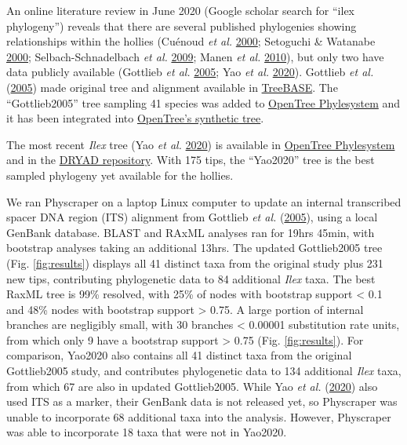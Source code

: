 \documentclass[]{article}
\begin{document}
An online literature review in June 2020 (Google scholar search for ``ilex phylogeny'') reveals that there are several published phylogenies showing relationships within the hollies (Cuénoud \emph{et al.} \protect\hyperlink{ref-cuenoud2000molecular}{2000}; Setoguchi \& Watanabe \protect\hyperlink{ref-setoguchi2000intersectional}{2000}; Selbach-Schnadelbach \emph{et al.} \protect\hyperlink{ref-selbach2009new}{2009}; Manen \emph{et al.} \protect\hyperlink{ref-manen2010history}{2010}), but only two have data publicly available (Gottlieb \emph{et al.} \protect\hyperlink{ref-gottlieb2005molecular}{2005}; Yao \emph{et al.} \protect\hyperlink{ref-yao2020phylogeny}{2020}).
Gottlieb \emph{et al.} (\protect\hyperlink{ref-gottlieb2005molecular}{2005}) made original tree and alignment available in \href{https://treebase.org/treebase-web/search/study/summary.html?id=1091}{TreeBASE}. The ``Gottlieb2005'' tree sampling 41 species was added to \href{https://tree.opentreeoflife.org/curator/study/edit/pg_2827/?tab=home}{OpenTree Phylesystem} and it has been integrated into \href{https://devtree.opentreeoflife.org/opentree/opentree12.3@mrcaott68451ott89474/Ilex-theizans--Ilex-dumosa}{OpenTree's synthetic tree}.

The most recent \emph{Ilex} tree (Yao \emph{et al.} \protect\hyperlink{ref-yao2020phylogeny}{2020}) is available in \href{https://tree.opentreeoflife.org/curator/study/view/ot_1984}{OpenTree Phylesystem} and in the \href{https://datadryad.org/stash/dataset/doi:10.5061/dryad.k0p2ngf4x}{DRYAD repository}. With 175 tips, the ``Yao2020'' tree is the best sampled phylogeny yet available for the hollies.

We ran Physcraper on a laptop Linux computer to update an internal transcribed spacer DNA region (ITS) alignment from Gottlieb \emph{et al.} (\protect\hyperlink{ref-gottlieb2005molecular}{2005}), using a local GenBank database. BLAST and RAxML analyses ran for 19hrs 45min, with bootstrap analyses taking an additional 13hrs.
The updated Gottlieb2005 tree (Fig. \ref{fig:results}) displays all 41 distinct taxa from the original study plus 231 new tips, contributing phylogenetic data to 84 additional \emph{Ilex} taxa. The best RaxML tree is 99\% resolved, with 25\% of nodes with bootstrap support \textless{} 0.1 and 48\% nodes with bootstrap support \textgreater{} 0.75.
A large portion of internal branches are negligibly small, with 30 branches \textless{} 0.00001 substitution rate units, from which only 9 have a bootstrap support \textgreater{} 0.75 (Fig. \ref{fig:results}).
For comparison, Yao2020 also contains all 41 distinct taxa from the original Gottlieb2005 study,
and contributes phylogenetic data to 134 additional \emph{Ilex} taxa, from which
67 are also in updated Gottlieb2005. While Yao \emph{et al.} (\protect\hyperlink{ref-yao2020phylogeny}{2020}) also used ITS as a marker, their GenBank data is not released yet, so Physcraper was unable to incorporate 68 additional taxa into the analysis. However, Physcraper was able to incorporate 18 taxa that were not in Yao2020.
\end{document}
